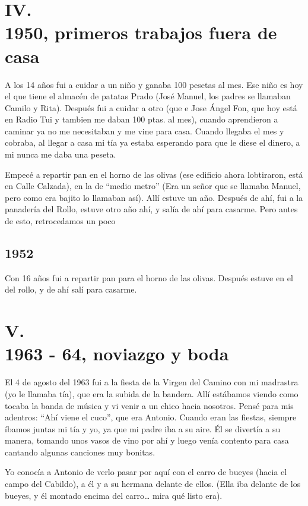 \documentclass[12pt,a5paper]{book}
\begin{document}
\section*{IV.\\1950, primeros trabajos fuera de casa}

A los 14 años fui a cuidar a un niño y ganaba 100 pesetas al mes. Ese niño es hoy el que tiene el almacén de patatas Prado (José Manuel, los padres se llamaban Camilo y Rita). Después fui a cuidar a otro (que e Jose Ángel Fon, que hoy está en Radio Tui y tambien me daban 100 ptas. al mes), cuando aprendieron a caminar ya no me necesitaban y me vine para casa. Cuando llegaba el mes y cobraba, al llegar a casa mi tía ya estaba esperando para que le diese el dinero, a mi nunca me daba una peseta.

Empecé a repartir pan en el horno de las olivas (ese edificio ahora lobtiraron, está en Calle Calzada), en la de “medio metro” (Era un señor que se llamaba Manuel, pero como era bajito lo llamaban así). Allí estuve un año. Después de ahí, fui a la panadería del Rollo, estuve otro año ahí, y salía de ahí para casarme. Pero antes de esto, retrocedamos un poco



\subsection*{1952}

Con 16 años fui a repartir pan para el horno de las olivas. Después estuve en el del rollo, y de ahí salí para casarme.



\section*{V.\\1963 - 64, noviazgo y boda}


El 4 de agosto del 1963 fui a la fiesta de la Virgen del Camino con mi madrastra (yo le llamaba tía), que era la subida de la bandera. Allí estábamos viendo como tocaba la banda de música y vi venir a un chico hacia nosotros. Pensé para mis adentros: “Ahí viene el cuco”, que era Antonio.
Cuando eran las fiestas, siempre íbamos juntas mi tía y yo, ya que mi padre iba a su aire. Él se divertía a su manera, tomando unos vasos de vino por ahí y luego venía contento para casa cantando algunas canciones muy bonitas.

Yo conocía a Antonio de verlo pasar por aquí con el carro de bueyes (hacia el campo del Cabildo), a él y a su hermana delante de ellos. (Ella iba delante de los bueyes, y él montado encima del carro… mira qué listo era).
\end{document}
